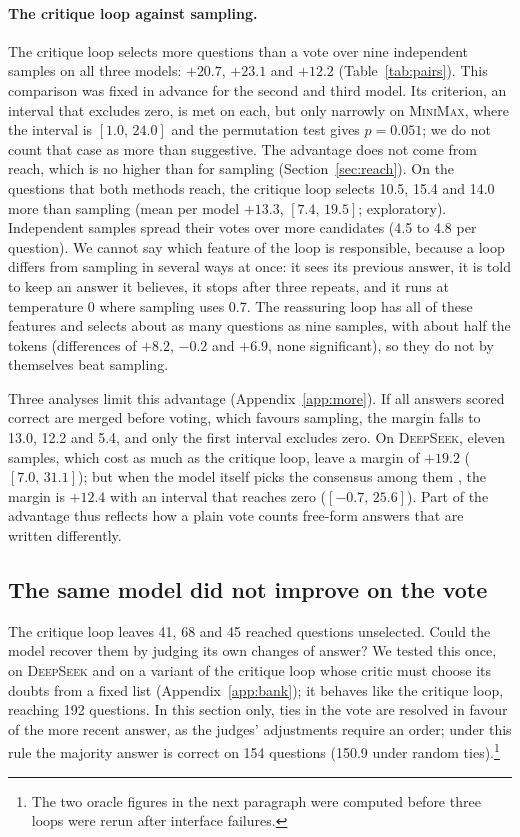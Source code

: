 \documentclass[11pt]{article}
\newcommand{\ds}{\textsc{DeepSeek}}
\newcommand{\mm}{\textsc{MiniMax}}
\newcommand{\ci}[2]{$[#1,\,#2]$}
\begin{document}
\paragraph{The critique loop against sampling.}
The critique loop selects more questions than a vote over nine independent samples on all three models: $+20.7$, $+23.1$ and $+12.2$ (Table~\ref{tab:pairs}).
This comparison was fixed in advance for the second and third model.
Its criterion, an interval that excludes zero, is met on each, but only narrowly on \mm{}, where the interval is \ci{1.0}{24.0} and the permutation test gives $p=0.051$; we do not count that case as more than suggestive.
The advantage does not come from reach, which is no higher than for sampling (Section~\ref{sec:reach}).
On the questions that both methods reach, the critique loop selects 10.5, 15.4 and 14.0 more than sampling (mean per model $+13.3$, \ci{7.4}{19.5}; exploratory).
Independent samples spread their votes over more candidates (4.5 to 4.8 per question).
We cannot say which feature of the loop is responsible, because a loop differs from sampling in several ways at once: it sees its previous answer, it is told to keep an answer it believes, it stops after three repeats, and it runs at temperature 0 where sampling uses 0.7.
The reassuring loop has all of these features and selects about as many questions as nine samples, with about half the tokens (differences of $+8.2$, $-0.2$ and $+6.9$, none significant), so they do not by themselves beat sampling.

Three analyses limit this advantage (Appendix~\ref{app:more}).
If all answers scored correct are merged before voting, which favours sampling, the margin falls to 13.0, 12.2 and 5.4, and only the first interval excludes zero.
On \ds, eleven samples, which cost as much as the critique loop, leave a margin of $+19.2$ (\ci{7.0}{31.1}); but when the model itself picks the consensus among them \citep{chen2023usc}, the margin is $+12.4$ with an interval that reaches zero (\ci{-0.7}{25.6}).
Part of the advantage thus reflects how a plain vote counts free-form answers that are written differently.

\subsection{The same model did not improve on the vote}
\label{sec:judges}

The critique loop leaves 41, 68 and 45 reached questions unselected.
Could the model recover them by judging its own changes of answer?
We tested this once, on \ds{} and on a variant of the critique loop whose critic must choose its doubts from a fixed list (Appendix~\ref{app:bank}); it behaves like the critique loop, reaching 192 questions.
In this section only, ties in the vote are resolved in favour of the more recent answer, as the judges' adjustments require an order; under this rule the majority answer is correct on 154 questions (150.9 under random ties).\footnote{The two oracle figures in the next paragraph were computed before three loops were rerun after interface failures.}
\end{document}

